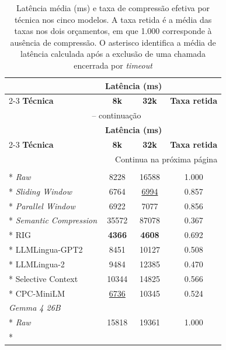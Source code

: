 {
\small
\setlength{\tabcolsep}{6pt}
\begin{longtable}{lcc|c}
\caption{Latência média (ms) e taxa de compressão efetiva por técnica nos cinco modelos. A taxa retida é a média das taxas nos dois orçamentos, em que 1.000 corresponde à ausência de compressão. O asterisco identifica a média de latência calculada após a exclusão de uma chamada encerrada por \textit{timeout}}
\label{tab:latencia-compressao-atual} \\
\toprule
& \multicolumn{2}{c|}{\textbf{Latência (ms)}} & \\
\cmidrule(lr){2-3}
\textbf{Técnica} & \textbf{8k} & \textbf{32k} & \textbf{Taxa retida} \\
\midrule
\endfirsthead
\multicolumn{4}{c}{\tablename\ \thetable{} -- continuação} \\
\toprule
& \multicolumn{2}{c|}{\textbf{Latência (ms)}} & \\
\cmidrule(lr){2-3}
\textbf{Técnica} & \textbf{8k} & \textbf{32k} & \textbf{Taxa retida} \\
\midrule
\endhead
\midrule
\multicolumn{4}{r}{Continua na próxima página} \\
\endfoot
\bottomrule
\endlastfoot
\multicolumn{4}{l}{\textit{Llama 3.1 8B}} \\*
\textit{Raw}                   & 8228             & 16588            & 1.000 \\*
\textit{Sliding Window}        & 6764             & \underline{6994} & 0.857 \\*
\textit{Parallel Window}       & 6922             & 7077             & 0.856 \\*
\textit{Semantic Compression}  & 35572            & 87078            & 0.367 \\*
RIG                            & \textbf{4366}    & \textbf{4608}    & 0.692 \\*
LLMLingua-GPT2                 & 8451             & 10127            & 0.508 \\*
LLMLingua-2                    & 9484             & 12385            & 0.470 \\*
Selective Context              & 10344            & 14825            & 0.566 \\*
CPC-MiniLM                     & \underline{6736} & 10345            & 0.524 \\
\midrule
\multicolumn{4}{l}{\textit{Gemma 4 26B}} \\*
\textit{Raw}                   & 15818             & 19361             & 1.000 \\*

\end{longtable}}
